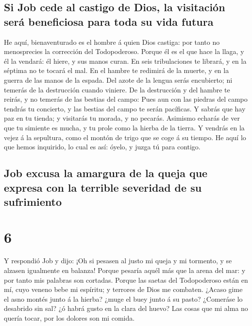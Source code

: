 \hypertarget{si-job-cede-al-castigo-de-dios-la-visitaciuxf3n-seruxe1-beneficiosa-para-toda-su-vida-futura}{%
\subsection{Si Job cede al castigo de Dios, la visitación será
beneficiosa para toda su vida
futura}\label{si-job-cede-al-castigo-de-dios-la-visitaciuxf3n-seruxe1-beneficiosa-para-toda-su-vida-futura}}

 He aquí, bienaventurado es el hombre á quien Dios castiga:
por tanto no menosprecies la corrección del Todopoderoso. 
Porque él es el que hace la llaga, y él la vendará: él hiere, y sus
manos curan.  En seis tribulaciones te librará, y en la
séptima no te tocará el mal.  En el hambre te redimirá de
la muerte, y en la guerra de las manos de la espada.  Del
azote de la lengua serás encubierto; ni temerás de la destrucción cuando
viniere.  De la destrucción y del hambre te reirás, y no
temerás de las bestias del campo:  Pues aun con las piedras
del campo tendrás tu concierto, y las bestias del campo te serán
pacíficas.  Y sabrás que hay paz en tu tienda; y visitarás
tu morada, y no pecarás.  Asimismo echarás de ver que tu
simiente es mucha, y tu prole como la hierba de la tierra. 
Y vendrás en la vejez á la sepultura, como el montón de trigo que se
coge á su tiempo.  He aquí lo que hemos inquirido, lo cual
es así: óyelo, y juzga tú para contigo.

\hypertarget{job-excusa-la-amargura-de-la-queja-que-expresa-con-la-terrible-severidad-de-su-sufrimiento}{%
\subsection{Job excusa la amargura de la queja que expresa con la
terrible severidad de su
sufrimiento}\label{job-excusa-la-amargura-de-la-queja-que-expresa-con-la-terrible-severidad-de-su-sufrimiento}}

\hypertarget{section-5}{%
\section{6}\label{section-5}}

 Y respondió Job y dijo:  ¡Oh si pesasen al
justo mi queja y mi tormento, y se alzasen igualmente en balanza!
 Porque pesaría aquél más que la arena del mar: y por tanto
mis palabras son cortadas.  Porque las saetas del
Todopoderoso están en mí, cuyo veneno bebe mi espíritu; y terrores de
Dios me combaten.  ¿Acaso gime el asno montés junto á la
hierba? ¿muge el buey junto á su pasto?  ¿Comeráse lo
desabrido sin sal? ¿ó habrá gusto en la clara del huevo? 
Las cosas que mi alma no quería tocar, por los dolores son mi comida.

